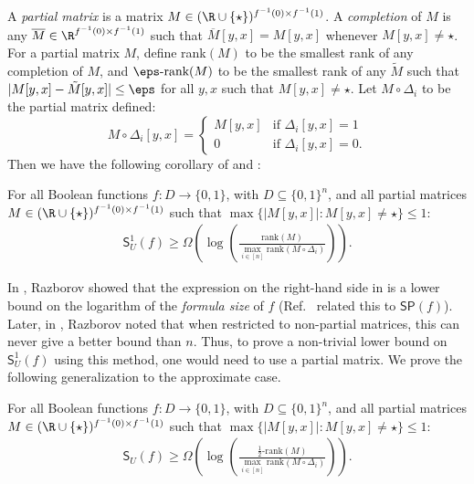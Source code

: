 \documentclass{toc}
\begin{document}
A \emph{partial matrix} is a matrix $M\in (\R\cup\{\star\})^{f^{-1}(0)\times f^{-1}(1)}$. A \emph{completion} of $M$ is any $\overline{M}\in\R^{f^{-1}(0)\times f^{-1}(1)}$ such that $\overline{M}[y,x]=M[y,x]$ whenever $M[y,x]\neq \star$. For a partial matrix $M$, define rank$(M)$ to be the smallest rank of any completion of $M$, and $\eps\mbox{-rank}(M)$ to be the smallest rank of any $\tilde{M}$ such that $|M[y,x]-\tilde{M}[y,x]|\leq \eps$ for all $y,x$ such that $M[y,x]\neq \star$. Let $M\circ\Delta_i$ to be the partial matrix defined:
$$M\circ \Delta_i[y,x]=\left\{\begin{array}{ll}
M[y,x] & \mbox{if }\Delta_i[y,x]=1\\
0 & \mbox{if }\Delta_i[y,x]=0.
\end{array}\right.$$
Then we have the following corollary of \cite[Lemma 3.2, Theorem 3.4]{Gal01} and :
\begin{lemma}\label{lem:rank-method-one-sided}
For all Boolean functions $f:D\rightarrow\{0,1\}$, with $D\subseteq \{0,1\}^n$, and all partial matrices $M\in (\R\cup\{\star\})^{f^{-1}(0)\times f^{-1}(1)}$ such that $\max\{|M[y,x]|:M[y,x]\neq \star\}\leq 1$:
\begin{align*}
\mathsf{S}_U^1(f)\geq \Omega\left(\log\left(\frac{\mathrm{rank}(M)}{\max_{i\in[n]}\mathrm{rank}(M\circ\Delta_i)}\right)\right).
\end{align*}
\end{lemma}
In \cite{Raz90}, Razborov showed that the expression on the right-hand side in  is a lower bound on the logarithm of the \emph{formula size} of $f$ (Ref.~\cite{Gal01} related this to $\mathsf{SP}(f)$). Later, in \cite{Raz92}, Razborov noted that when restricted to non-partial matrices, this can never give a better bound than $n$. Thus, to prove a non-trivial lower bound on $\mathsf{S}_U^1(f)$ using this method, one would need to use a partial matrix. We prove the following generalization to the approximate case. 
\begin{lemma}\label{lem:rank-method}
For all Boolean functions $f:D\rightarrow\{0,1\}$, with $D\subseteq \{0,1\}^n$, and all partial matrices $M\in (\R\cup\{\star\})^{f^{-1}(0)\times f^{-1}(1)}$ such that $\max\{|M[y,x]|:M[y,x]\neq \star\}\leq 1$:
\begin{align*}
\mathsf{S}_U(f)\geq \Omega\left(\log\left(\frac{\frac{1}{2}\mbox{-}\mathrm{rank}(M)}{\max_{i\in[n]}\mathrm{rank}(M\circ\Delta_i)}\right)\right).
\end{align*}
\end{lemma}
\end{document}
